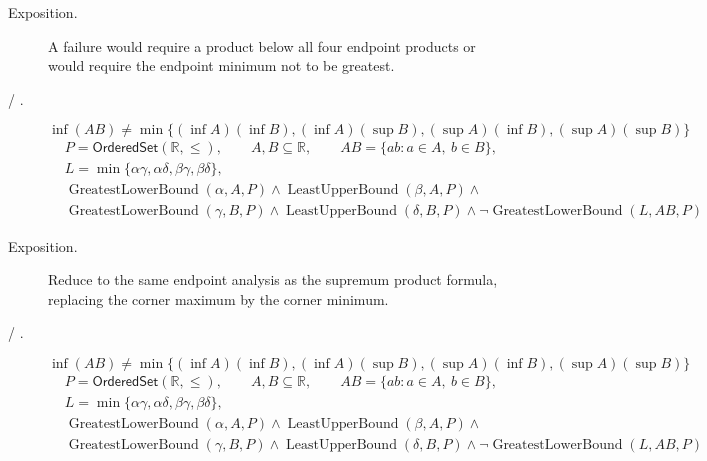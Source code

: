 \begin{remark*}
\begin{description}
  \item[Exposition.]
A failure would require a product below all four endpoint products or would
require the endpoint minimum not to be greatest.


  \item[ / .]
  \[
\inf(AB)\neq
\min\{(\inf A)(\inf B),(\inf A)(\sup B),(\sup A)(\inf B),(\sup A)(\sup B)\}
\]
\[
\begin{aligned}
&P=\mathsf{OrderedSet}(\mathbb{R},\leq),\qquad
A,B\subseteq\mathbb{R},\qquad AB=\{ab:a\in A,\ b\in B\},\\
&L=\min\{\alpha\gamma,\alpha\delta,\beta\gamma,\beta\delta\},\\
&\operatorname{GreatestLowerBound}(\alpha,A,P)\land
\operatorname{LeastUpperBound}(\beta,A,P)\land\\
&\operatorname{GreatestLowerBound}(\gamma,B,P)\land
\operatorname{LeastUpperBound}(\delta,B,P)\land
\neg\operatorname{GreatestLowerBound}(L,AB,P)
\end{aligned}
\]
\end{description}
\end{remark*}

\begin{remark*}
\begin{description}
  \item[Exposition.]
Reduce to the same endpoint analysis as the supremum product formula, replacing
the corner maximum by the corner minimum.


  \item[ / .]
  \[
\inf(AB)\neq
\min\{(\inf A)(\inf B),(\inf A)(\sup B),(\sup A)(\inf B),(\sup A)(\sup B)\}
\]
\[
\begin{aligned}
&P=\mathsf{OrderedSet}(\mathbb{R},\leq),\qquad
A,B\subseteq\mathbb{R},\qquad AB=\{ab:a\in A,\ b\in B\},\\
&L=\min\{\alpha\gamma,\alpha\delta,\beta\gamma,\beta\delta\},\\
&\operatorname{GreatestLowerBound}(\alpha,A,P)\land
\operatorname{LeastUpperBound}(\beta,A,P)\land\\
&\operatorname{GreatestLowerBound}(\gamma,B,P)\land
\operatorname{LeastUpperBound}(\delta,B,P)\land
\neg\operatorname{GreatestLowerBound}(L,AB,P)
\end{aligned}
\]
\end{description}
\end{remark*}

